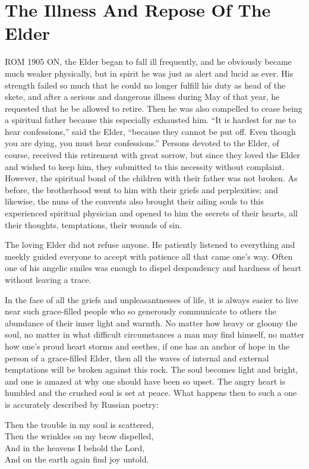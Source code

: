\chapter{The Illness And Repose Of The Elder}
ROM 1905 ON, the Elder began to fall ill frequently, and he obviously became much weaker physically, but in spirit he was just as alert and lucid as ever. His strength failed so much that he could no longer fulfill his duty as head of the skete, and after a serious and dangerous illness during May of that year, he requested that he be allowed to retire. Then he was also compelled to cease being a spiritual father because this especially exhausted him. “It is hardest for me to hear confessions,” said the Elder, “because they cannot be put off. Even though you are dying, you must hear confessions.” Persons devoted to the Elder, of course, received this retirement with great sorrow, but since they loved the Elder and wished to keep him, they submitted to this necessity without complaint. However, the spiritual bond of the children with their father was not broken. As before, the brotherhood went to him with their griefs and perplexities; and likewise, the nuns of the convents also brought their ailing souls to this experienced spiritual physician and opened to him the secrets of their hearts, all their thoughts, temptations, their wounds of sin.

The loving Elder did not refuse anyone. He patiently listened to everything and meekly guided everyone to accept with patience all that came one's way. Often one of his angelic smiles was enough to dispel despondency and hardness of heart without leaving a trace.

In the face of all the griefs and unpleasantnesses of life, it is always easier to live near such grace-filled people who so generously communicate to others the abundance of their inner light and warmth. No matter how heavy or gloomy the soul, no matter in what difficult circumstances a man may find himself, no matter how one's proud heart storms and seethes, if one has an anchor of hope in the person of a grace-filled Elder, then all the waves of internal and external temptations will be broken against this rock. The soul becomes light and bright, and one is amazed at why one should have been so upset. The angry heart is humbled and the crushed soul is set at peace. What happens then to such a one is accurately described by Russian poetry:

\begin{adjustwidth}{1.5cm}{1.5cm}
\center
\vspace*{.5cm}
Then the trouble in my soul is scattered,\\Then the wrinkles on my brow dispelled,\\And in the heavens I behold the Lord,\\And on the earth again find joy untold.
\vspace*{.5cm}
\end{adjustwidth}

